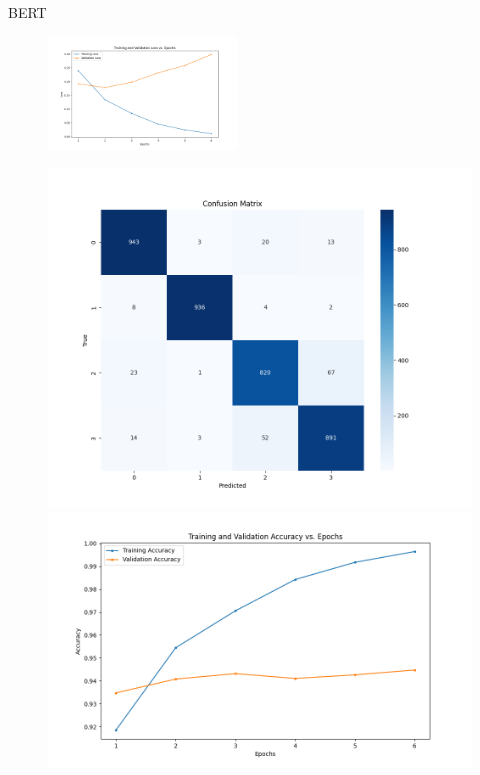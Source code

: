 \documentclass{beamer}
\begin{document}
\begin{frame}{BERT}
  \begin{figure}[H]
    \centering
    \includegraphics[width=5cm]{pictures/BERT/BERTloss_curve.png}
  \end{figure}
  \begin{figure}[htbp]
    \centering
    \begin{minipage}{0.49\linewidth}
      \centering
      \includegraphics[width=0.9\linewidth]{pictures/BERT/BERTconfusion_matrix.png}
    \end{minipage}
    \begin{minipage}{0.49\linewidth}
      \centering
      \includegraphics[width=0.9\linewidth]{pictures/BERT/BERTaccuracy_curve.png}
    \end{minipage}
  \end{figure}
\end{frame}
\end{document}
